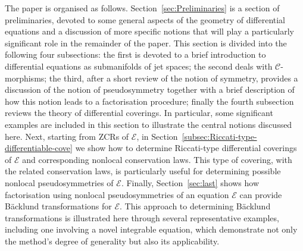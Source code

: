 \documentclass[12pt,english]{elsarticle}
\theoremstyle{plain}
\theoremstyle{plain}
\theoremstyle{remark}
\theoremstyle{plain}
\theoremstyle{definition}
\theoremstyle{definition}
\begin{document}
The paper is organised as follows. Section~\ref{sec:Preliminaries} is a section of preliminaries,
devoted to some general aspects of the geometry of differential equations
and a discussion of more specific notions that will play a particularly
significant role in the remainder of the paper. This section is divided
into the following four subsections: the first is devoted to a brief introduction
to differential equations as submanifolds of jet spaces; the second deals
with $\mathcal{C}$-morphisms; the third, after a short review of the notion
of symmetry, provides a discussion of the notion of pseudosymmetry together
with a brief description of how this notion leads to a factorisation procedure;
finally the fourth subsection reviews the theory of differential coverings.
In particular, some significant examples are included in this section to
illustrate the central notions discussed here. Next, starting from ZCRs
of $\mathcal{E}$, in Section~\ref{subsec:Riccati-type-differentiable-cove} we show how to determine Riccati-type differential
coverings of $\mathcal{E}$ and corresponding nonlocal conservation laws.
This type of covering, with the related conservation laws, is particularly
useful for determining possible nonlocal pseudosymmetries of
$\mathcal{E}$. Finally, Section~\ref{sec:last} shows how factorisation using nonlocal
pseudosymmetries of an equation $\mathcal{E}$ can provide B\"{a}cklund
transformations for $\mathcal{E}$. This approach to determining B\"{a}cklund
transformations is illustrated here through several representative examples,
including one involving a novel integrable equation, which demonstrate
not only the method's degree of generality but also its applicability.
\end{document}
